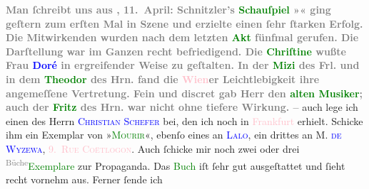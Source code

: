            \noindent{}\textcolor{gray}{\textbf{Man ſchreibt uns aus \textcolor{pink}{}{}\ledrightnote{\textcolor{pink}{Köln}}, 11. April: Schnitzler’s \textcolor{green}{Schauſpiel}{} »\textcolor{green}{}{}\ledrightnote{\textcolor{green}{Liebelei. Schauspiel in drei Akten}}« ging geſtern zum erſten Mal in Szene und erzielte einen ſehr
                  ſtarken Erfolg. Die Mitwirkenden wurden nach dem letzten \textcolor{green}{Akt}{} fünfmal gerufen. Die Darſtellung war
                  im Ganzen recht befriedigend. Die \textcolor{green}{Chriſtine}{} wußte Frau \textcolor{blue}{Doré}{}\ledrightnote{\textcolor{blue}{Adele Doré}} in ergreifender Weise zu geſtalten. In der \textcolor{green}{Mizi}{} des Frl. \textcolor{blue}{}{}\ledrightnote{\textcolor{blue}{Marie Glümer}} und in dem \textcolor{green}{Theodor}{}
                  des Hrn. \textcolor{blue}{}{}\ledrightnote{\textcolor{blue}{Rudolf Leyrer}} fand die \textcolor{pink}{Wien}{}\ledrightnote{\textcolor{pink}{Wien}}er Leichtlebigkeit ihre
                  angemeſſene Vertretung. Fein und discret gab Herr \textcolor{blue}{}{}\ledrightnote{\textcolor{blue}{Beck}} den \textcolor{green}{alten Musiker}{};
                  auch der \textcolor{green}{Fritz}{} des Hrn. \textcolor{blue}{}{}\ledrightnote{\textcolor{blue}{Heinz Monnard}} war nicht ohne tiefere Wirkung. –}}\pend
           {\bigskip}\pstart
           \noindent{}auch lege ich einen \label{K_L02772-3v}\label{K_L02772-3h} des Herrn \textsc{\textcolor{blue}{Christian Schefer}{}\ledrightnote{\textcolor{blue}{Christian Schefer}}} bei, den ich noch in \textcolor{pink}{Frankfurt}{}\ledrightnote{\textcolor{pink}{Frankfurt am Main}} erhielt.
               Schicke ihm ein Exemplar von »\textsc{\textcolor{green}{Mourir}{}\ledrightnote{\textcolor{green}{Mourir. Roman}}}«, ebenſo eines an \textsc{\textcolor{blue}{Lalo}{}\ledrightnote{\textcolor{blue}{Pierre Lalo}}}, ein drittes an \textsc{M. \textcolor{blue}{de
                     Wyzewa}{}\ledrightnote{\textcolor{blue}{Théodore de Wyzewa}}, \textcolor{pink}{9. Rue Coëtlogon}{}\ledrightnote{\textcolor{pink}{Rue Coëtlogon}}}. Auch ſchicke mir noch zwei oder {\pb}drei \substVorne{}\textsuperscript{\textcolor{gray}{Büche}}\substDazwischen{}\textcolor{green}{Exemplare}{}\substHinten{} zur Propaganda. Das \textcolor{green}{Buch}{} iſt ſehr gut ausgeſtattet und ſieht recht vornehm aus. Ferner ſende ich
